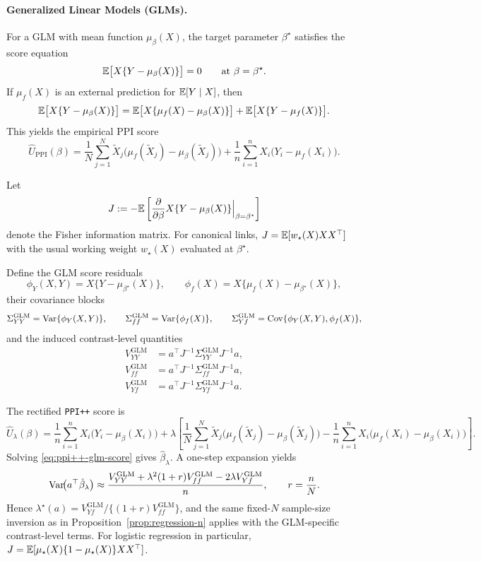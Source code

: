\paragraph{Generalized Linear Models (GLMs).}
For a GLM with mean function $\mu_\beta(X)$, the target parameter
$\beta^\star$ satisfies the score equation
\[
\mathbb{E}\big[X\{Y-\mu_\beta(X)\}\big]=0
\qquad\text{at }\beta=\beta^\star.
\]
If $\mu_f(X)$ is an external prediction for $\mathbb{E}[Y\mid X]$, then
\[
\mathbb{E}\big[X\{Y-\mu_\beta(X)\}\big]
=
\mathbb{E}\big[X\{\mu_f(X)-\mu_\beta(X)\}\big]
+
\mathbb{E}\big[X\{Y-\mu_f(X)\}\big].
\]
This yields the empirical PPI score
\[
\hat U_{\mathrm{PPI}}(\beta)
=
\frac{1}{N}\sum_{j=1}^N \tilde X_j\big(\mu_f(\tilde X_j)-\mu_\beta(\tilde X_j)\big)
+
\frac{1}{n}\sum_{i=1}^n X_i\big(Y_i-\mu_f(X_i)\big).
\]

Let
\[
J
:=
-\mathbb{E}\left[\frac{\partial}{\partial\beta}
X\{Y-\mu_\beta(X)\}\Big|_{\beta=\beta^\star}\right]
\]
denote the Fisher information matrix. For canonical links,
$J=\mathbb{E}[w_\star(X)XX^\top]$ with the usual working weight
$w_\star(X)$ evaluated at $\beta^\star$.

Define the GLM score residuals
\[
\phi_Y(X,Y)=X\{Y-\mu_{\beta^\star}(X)\},
\qquad
\phi_f(X)=X\{\mu_f(X)-\mu_{\beta^\star}(X)\},
\]
their covariance blocks
\[
\Sigma_{YY}^{\mathrm{GLM}}=\mathrm{Var}\{\phi_Y(X,Y)\},
\qquad
\Sigma_{ff}^{\mathrm{GLM}}=\mathrm{Var}\{\phi_f(X)\},
\qquad
\Sigma_{Yf}^{\mathrm{GLM}}=\mathrm{Cov}\{\phi_Y(X,Y),\phi_f(X)\},
\]
and the induced contrast-level quantities
\begin{align*}
V_{YY}^{\mathrm{GLM}}
&=
a^\top J^{-1}\Sigma_{YY}^{\mathrm{GLM}}J^{-1}a, \\
V_{ff}^{\mathrm{GLM}}
&=
a^\top J^{-1}\Sigma_{ff}^{\mathrm{GLM}}J^{-1}a, \\
V_{Yf}^{\mathrm{GLM}}
&=
a^\top J^{-1}\Sigma_{Yf}^{\mathrm{GLM}}J^{-1}a.
\end{align*}

The rectified \texttt{PPI++} score is
\begin{equation}\label{eq:ppi++-glm-score}
\hat U_\lambda(\beta)
=
\frac{1}{n}\sum_{i=1}^n X_i\big(Y_i-\mu_\beta(X_i)\big)
+
\lambda\left[
\frac{1}{N}\sum_{j=1}^N \tilde X_j\big(\mu_f(\tilde X_j)-\mu_\beta(\tilde X_j)\big)
-
\frac{1}{n}\sum_{i=1}^n X_i\big(\mu_f(X_i)-\mu_\beta(X_i)\big)
\right].
\end{equation}
Solving \eqref{eq:ppi++-glm-score} gives $\hat\beta_\lambda$. A
one-step expansion yields
\[
\mathrm{Var}\!\big(a^\top\hat\beta_\lambda\big)
\approx
\frac{
V_{YY}^{\mathrm{GLM}}
+
\lambda^2(1+r)V_{ff}^{\mathrm{GLM}}
-2\lambda V_{Yf}^{\mathrm{GLM}}
}{n},
\qquad
r=\frac{n}{N}.
\]
Hence
$\lambda^\star(a)=V_{Yf}^{\mathrm{GLM}}/\{(1+r)V_{ff}^{\mathrm{GLM}}\}$,
and the same fixed-$N$ sample-size inversion as in
Proposition~\ref{prop:regression-n} applies with the GLM-specific
contrast-level terms. For logistic regression in particular,
$J=\mathbb{E}[\mu_\star(X)\{1-\mu_\star(X)\}XX^\top]$.

